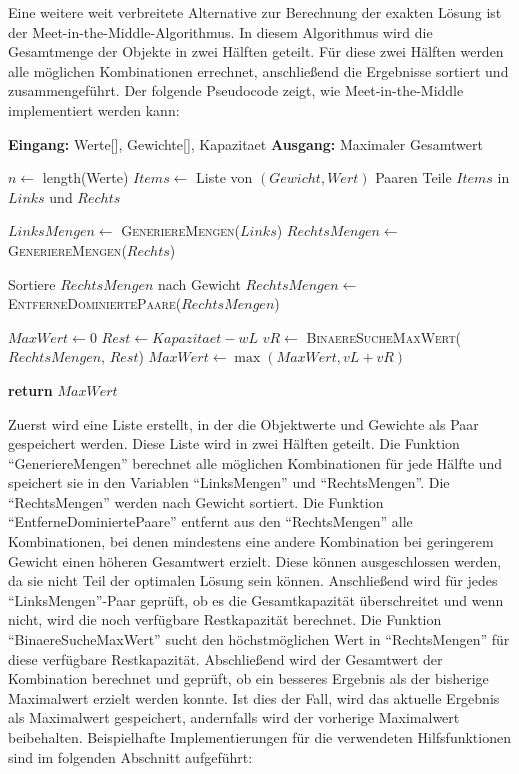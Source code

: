 Eine weitere weit verbreitete Alternative zur Berechnung der exakten Lösung ist der Meet-in-the-Middle-Algorithmus. In diesem Algorithmus wird die Gesamtmenge der Objekte in zwei Hälften geteilt. Für diese zwei Hälften werden alle möglichen Kombinationen errechnet, anschließend die Ergebnisse sortiert und zusammengeführt. Der folgende Pseudocode zeigt, wie Meet-in-the-Middle implementiert werden kann:

\begin{algorithmic}
    \State \textbf{Eingang:} Werte[], Gewichte[], Kapazitaet
    \State \textbf{Ausgang:} Maximaler Gesamtwert

    \State $n \leftarrow$ length(Werte)
    \State $Items \leftarrow$ Liste von $(Gewicht, Wert)$ Paaren
    \State Teile $Items$ in $Links$ und $Rechts$

    \State $LinksMengen \leftarrow$ \textsc{GeneriereMengen}($Links$)
    \State $RechtsMengen \leftarrow$ \textsc{GeneriereMengen}($Rechts$)

    \State Sortiere $RechtsMengen$ nach Gewicht
    \State $RechtsMengen \leftarrow$ \textsc{EntferneDominiertePaare}($RechtsMengen$)

    \State $MaxWert \leftarrow 0$
            \State $Rest \leftarrow Kapazitaet - wL$
            \State $vR \leftarrow$ \textsc{BinaereSucheMaxWert}($RechtsMengen$, $Rest$)
            \State $MaxWert \leftarrow \max(MaxWert, vL + vR)$
        \EndIf
    \EndFor

    \State \textbf{return} $MaxWert$

\end{algorithmic}

Zuerst wird eine Liste erstellt, in der die Objektwerte und Gewichte als Paar gespeichert werden. Diese Liste wird in zwei Hälften geteilt. Die Funktion \enquote{GeneriereMengen} berechnet alle möglichen Kombinationen für jede Hälfte und speichert sie in den Variablen \enquote{LinksMengen} und \enquote{RechtsMengen}. Die \enquote{RechtsMengen} werden nach Gewicht sortiert. Die Funktion \enquote{EntferneDominiertePaare} entfernt aus den \enquote{RechtsMengen} alle Kombinationen, bei denen mindestens eine andere Kombination bei geringerem Gewicht einen höheren Gesamtwert erzielt. Diese können ausgeschlossen werden, da sie nicht Teil der optimalen Lösung sein können. Anschließend wird für jedes \enquote{LinksMengen}-Paar geprüft, ob es die Gesamtkapazität überschreitet und wenn nicht, wird die noch verfügbare Restkapazität berechnet. Die Funktion \enquote{BinaereSucheMaxWert} sucht den höchstmöglichen Wert in \enquote{RechtsMengen} für diese verfügbare Restkapazität. Abschließend wird der Gesamtwert der Kombination berechnet und geprüft, ob ein besseres Ergebnis als der bisherige Maximalwert erzielt werden konnte. Ist dies der Fall, wird das aktuelle Ergebnis als Maximalwert gespeichert, andernfalls wird der vorherige Maximalwert beibehalten. Beispielhafte Implementierungen für die verwendeten Hilfsfunktionen sind im folgenden Abschnitt aufgeführt:

